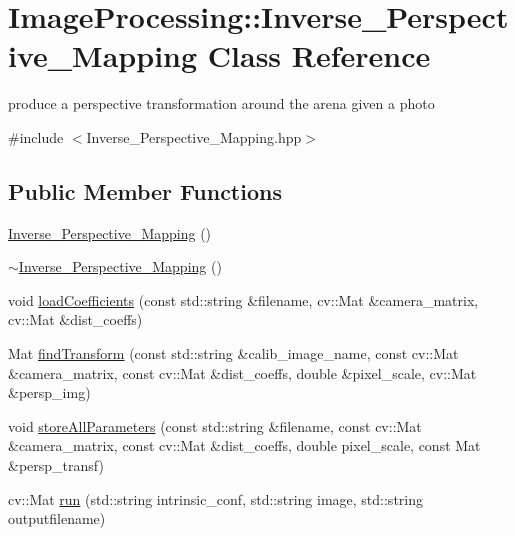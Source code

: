 \hypertarget{class_image_processing_1_1_inverse___perspective___mapping}{}\section{Image\+Processing\+:\+:Inverse\+\_\+\+Perspective\+\_\+\+Mapping Class Reference}
\label{class_image_processing_1_1_inverse___perspective___mapping}


produce a perspective transformation around the arena given a photo  




{\ttfamily \#include $<$Inverse\+\_\+\+Perspective\+\_\+\+Mapping.\+hpp$>$}

\subsection*{Public Member Functions}
\begin{DoxyCompactItemize}
\item 
\mbox{\hyperlink{class_image_processing_1_1_inverse___perspective___mapping_a71da0ca3af64c1c8e0942040252ddf94}{Inverse\+\_\+\+Perspective\+\_\+\+Mapping}} ()
\item 
\mbox{\hyperlink{class_image_processing_1_1_inverse___perspective___mapping_afb34e6ac0791527427978ba4a373d555}{$\sim$\+Inverse\+\_\+\+Perspective\+\_\+\+Mapping}} ()
\item 
void \mbox{\hyperlink{class_image_processing_1_1_inverse___perspective___mapping_a7ba3059b10475460e490a3819df90469}{load\+Coefficients}} (const std\+::string \&filename, cv\+::\+Mat \&camera\+\_\+matrix, cv\+::\+Mat \&dist\+\_\+coeffs)
\item 
Mat \mbox{\hyperlink{class_image_processing_1_1_inverse___perspective___mapping_ac523ad6faeba3e5c87b9c1b6765866e4}{find\+Transform}} (const std\+::string \&calib\+\_\+image\+\_\+name, const cv\+::\+Mat \&camera\+\_\+matrix, const cv\+::\+Mat \&dist\+\_\+coeffs, double \&pixel\+\_\+scale, cv\+::\+Mat \&persp\+\_\+img)
\item 
void \mbox{\hyperlink{class_image_processing_1_1_inverse___perspective___mapping_ac97445de9425cb7e45c449dc33dfee6e}{store\+All\+Parameters}} (const std\+::string \&filename, const cv\+::\+Mat \&camera\+\_\+matrix, const cv\+::\+Mat \&dist\+\_\+coeffs, double pixel\+\_\+scale, const Mat \&persp\+\_\+transf)
\item 
cv\+::\+Mat \mbox{\hyperlink{class_image_processing_1_1_inverse___perspective___mapping_ab7cd3520a334dd38b26b93b385158c83}{run}} (std\+::string intrinsic\+\_\+conf, std\+::string image, std\+::string outputfilename)
\end{DoxyCompactItemize}


